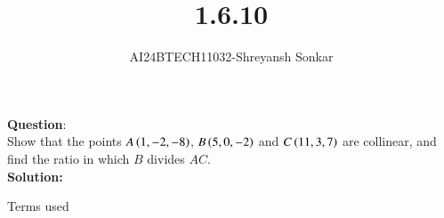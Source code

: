 \documentclass[journal]{IEEEtran}
\begin{document}

\vspace{3cm}

\title{1.6.10}
\author{AI24BTECH11032-Shreyansh Sonkar}
{\let\newpage\relax\maketitle}

\renewcommand{\thefigure}{\theenumi}
\renewcommand{\thetable}{\theenumi}
\setlength{\intextsep}{10pt} %


\renewcommand{\thetable}{\theenumi}


\textbf{Question}:\\
Show that the points $A\left(1, -2, -8\right)$, $B\left(5,0,-2\right)$ and $C\left(11,3,7\right)$ are collinear, and find the ratio in which $B$ divides $AC$.
\\
\textbf{Solution: }
\begin{table}[h!]
    \renewcommand{\thetable}{1}
    \centering
    
    \caption{Terms used}
    \label{TABLE 1:}
\end{table}
\end{document}
